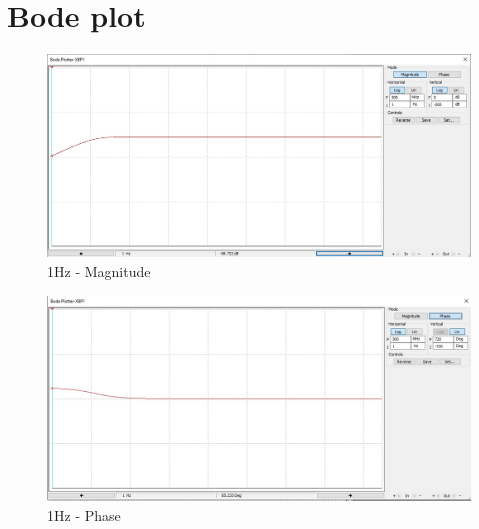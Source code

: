 \documentclass[a4paper,twoside]{report}
\begin{document}
	\section*{Bode plot}
		\begin{center}
			\begin{figure}[!h]
				\includegraphics[width=\textwidth]{Bode-1Hz-Magnitude.jpg}
				\caption{1Hz - Magnitude}
				\label{fig:bode-1Hz-Magnitude}
			\end{figure}
			\begin{figure}[!h]
				\includegraphics[width=\textwidth]{Bode-1Hz-Phase.jpg}
				\caption{1Hz - Phase}
				\label{fig:bode-1Hz-Phase}
			\end{figure}
		\end{center}
\end{document}

